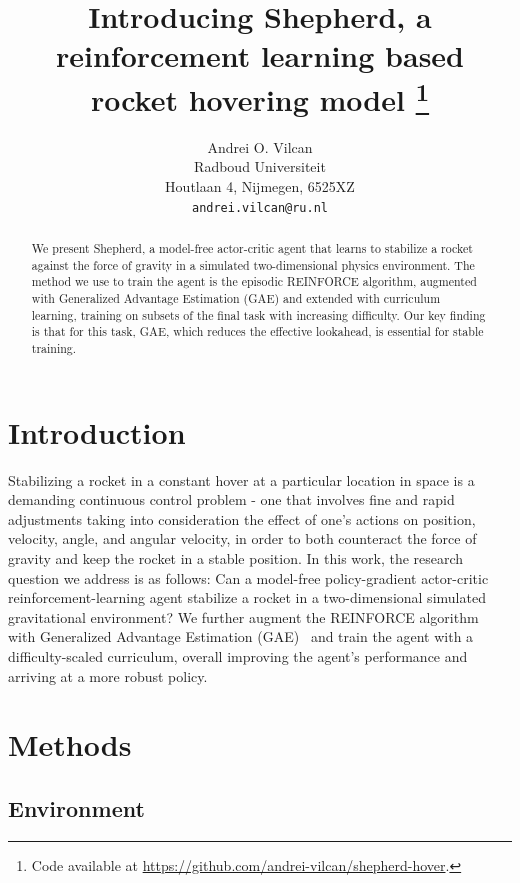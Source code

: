 \documentclass{article}
\title{Introducing Shepherd, a reinforcement learning based rocket hovering model
\thanks{Code available at \url{https://github.com/andrei-vilcan/shepherd-hover}.}}
\author{%
  Andrei O. Vilcan \\
  Radboud Universiteit \\
  Houtlaan 4, Nijmegen, 6525XZ
 \\
  \texttt{andrei.vilcan@ru.nl} \\
}
\begin{document}
\maketitle

\begin{abstract}

We present Shepherd, a model-free actor-critic agent that learns to stabilize a rocket against the force of gravity in a simulated two-dimensional physics environment. The method we use to train the agent is the episodic REINFORCE algorithm, augmented with Generalized Advantage Estimation (GAE) and extended with curriculum learning, training on subsets of the final task with increasing difficulty. Our key finding is that for this task, GAE, which reduces the effective lookahead, is essential for stable training. 

\end{abstract}


\section{Introduction}

Stabilizing a rocket in a constant hover at a particular location in space is a demanding continuous control problem - one that involves fine and rapid adjustments taking into consideration the effect of one's actions on position, velocity, angle, and angular velocity, in order to both counteract the force of gravity and keep the rocket in a stable position.
In this work, the research question we address is as follows: Can a model-free policy-gradient actor-critic reinforcement-learning agent stabilize a rocket in a two-dimensional simulated gravitational environment?
We further augment the REINFORCE algorithm~\citep{williams1992} with Generalized Advantage Estimation (GAE)~\citep{schulman2016} and train the agent with a difficulty-scaled curriculum, overall improving the agent's performance and arriving at a more robust policy.


\section{Methods}

\subsection{Environment}
\end{document}

